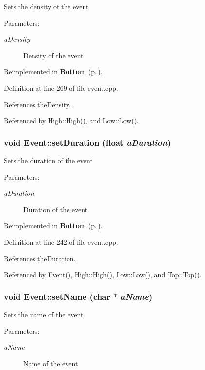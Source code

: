 Sets the density of the event \begin{Desc}
\item[Parameters:]
\begin{description}
\item[{\em a\-Density}]Density of the event \end{description}
\end{Desc}


Reimplemented in {\bf Bottom} {\rm (p.\,\pageref{classBottom_a9})}.

Definition at line 269 of file event.cpp.

References the\-Density.

Referenced by High::High(), and Low::Low().
\subsubsection{\setlength{\rightskip}{0pt plus 5cm}void Event::set\-Duration (float {\em a\-Duration})\hspace{0.3cm}{\tt  [virtual]}}\label{classEvent_a8}


Sets the duration of the event \begin{Desc}
\item[Parameters:]
\begin{description}
\item[{\em a\-Duration}]Duration of the event \end{description}
\end{Desc}


Reimplemented in {\bf Bottom} {\rm (p.\,\pageref{classBottom_a8})}.

Definition at line 242 of file event.cpp.

References the\-Duration.

Referenced by Event(), High::High(), Low::Low(), and Top::Top().
\subsubsection{\setlength{\rightskip}{0pt plus 5cm}void Event::set\-Name (char $\ast$ {\em a\-Name})\hspace{0.3cm}{\tt  [virtual]}}\label{classEvent_a10}


Sets the name of the event \begin{Desc}
\item[Parameters:]
\begin{description}
\item[{\em a\-Name}]Name of the event \end{description}
\end{Desc}


